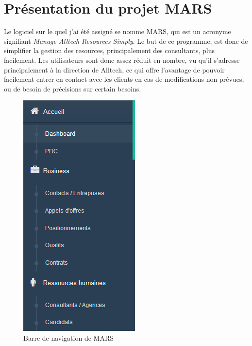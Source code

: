 \section{Présentation du projet MARS} \label{sec:presentation_mars}

Le logiciel sur le quel j'ai été assigné se nomme MARS, qui est un acronyme signifiant \textit{Manage Alltech Resources
Simply}. Le but de ce programme, est donc de simplifier la gestion des resources, principalement des consultants,
plus facilement. Les utilisateurs sont donc assez réduit en nombre, vu qu'il s'adresse principalement à la direction
de Alltech, ce qui offre l'avantage de pouvoir facilement entrer en contact avec les clients en cas de modifications
non prévues, ou de besoin de précisions sur certain besoins.

\begin{figure}[H]
    \centering
    \includegraphics[width=.4\linewidth]{images/MARS/navbar.png}
    \caption{Barre de navigation de MARS} \label{fig:mars_navbar}
\end{figure}

